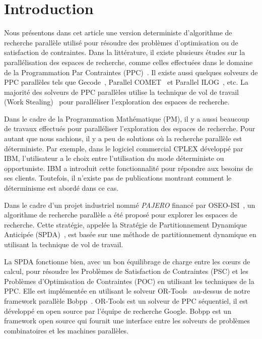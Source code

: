 \documentclass[parallelisme]{compas2014}
\begin{document}
\section{Introduction}\label{intro}
Nous présentons dans cet article une version deterministe d'algorithme de recherche parallèle utilisé pour résoudre des problèmes d'optimisation ou de satisfaction de contraintes.
Dans la littérature, il existe plusieurs études sur la parallélisation des espaces de recherche, comme celles effectuées dans le domaine de la Programmation Par Contraintes (PPC)~\cite{IPCJIMNCPNPPCU,LP,Rolf11,LaSH09}. Il existe aussi quelques solveurs de PPC parallèles tels que Gecode~\cite{MN}, Parallel COMET~\cite{MLSAVP2007} et Parallel ILOG~\cite{ibmilog}, etc. La majorité des solveurs de PPC parallèles utilise la technique de vol de travail (Work Stealing)~\cite{GCCSPS2009} pour paralléliser l'exploration des espaces de recherche.

Dans le cadre de la Programmation Mathématique (PM), il y a aussi beaucoup de travaux effectués pour paralléliser l'exploration des espaces de recherche. Pour autant que nous sachions, il y a peu de solutions où la recherche parallèle est déterministe. Par exemple, dans le logiciel commercial CPLEX développé par IBM, l'utilisateur a le choix entre l'utilisation du mode déterministe ou opportuniste. IBM a introduit cette fonctionnalité pour répondre aux besoins de ses clients. Toutefois, il n'existe pas de publications montrant comment le déterminisme est abordé dans ce cas. 

Dans le cadre d'un projet industriel nommé \textit{PAJERO} financé par OSEO-ISI~\cite{Pajero}, un algorithme de recherche parallèle a été proposé pour explorer les espaces de recherche. Cette stratégie, appelée la Stratégie de Partitionnement Dynamique Anticipée (SPDA)~\cite{TMBLPCO13}, est basée sur une méthode de partitionnement dynamique en utilisant la technique de vol de travail.

La SPDA fonctionne bien, avec un bon équilibrage de charge entre les cœurs de calcul, pour résoudre les Problèmes de Satisfaction de Contraintes (PSC) et les Problèmes d'Optimisation de Contraintes (POC) en utilisant les techniques de la PPC. Elle est implémentée en utilisant le solveur OR-Tools~\cite{LP} au-dessus de notre framework parallèle Bobpp~\cite{GaLe07}.
OR-Tools est un solveur de PPC séquentiel, il est développé en open source par l'équipe de recherche Google.
Bobpp est un framework open source qui fournit une interface entre les solveurs de problèmes combinatoires et les machines parallèles.
\end{document}
